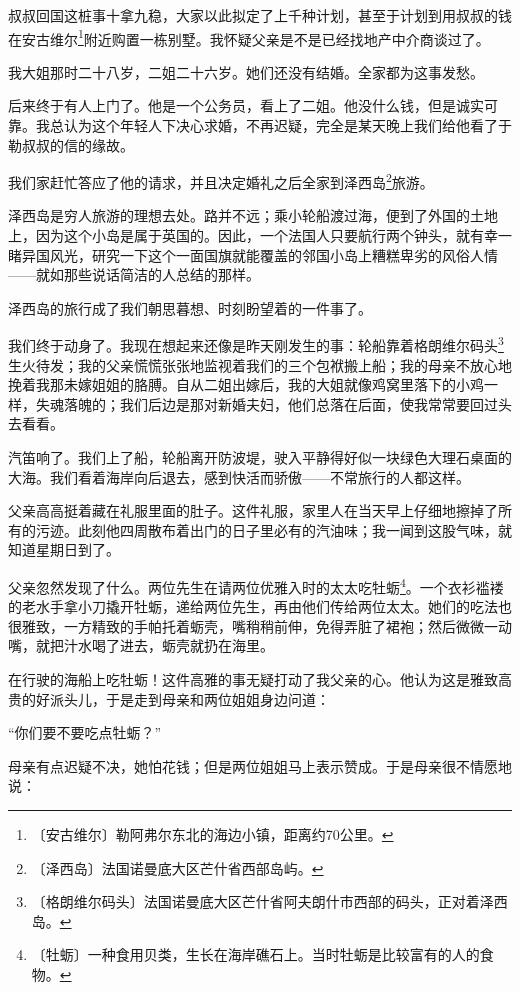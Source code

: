 \documentclass[12pt,UTF-8,openany]{ctexbook}
\begin{document}
\begin{large}
    叔叔回国这桩事十拿九稳，大家以此拟定了上千种计划，甚至于计划到用叔叔的钱在安古维尔\footnote{〔安古维尔〕勒阿弗尔东北的海边小镇，距离约70公里。}附近购置一栋别墅。我怀疑父亲是不是已经找地产中介商谈过了。
    
    我大姐那时二十八岁，二姐二十六岁。她们还没有结婚。全家都为这事发愁。
    
    后来终于有人上门了。他是一个公务员，看上了二姐。他没什么钱，但是诚实可靠。我总认为这个年轻人下决心求婚，不再迟疑，完全是某天晚上我们给他看了于勒叔叔的信的缘故。
    
    我们家赶忙答应了他的请求，并且决定婚礼之后全家到泽西岛\footnote{〔泽西岛〕法国诺曼底大区芒什省西部岛屿。}旅游。
    
    泽西岛是穷人旅游的理想去处。路并不远；乘小轮船渡过海，便到了外国的土地上，因为这个小岛是属于英国的。因此，一个法国人只要航行两个钟头，就有幸一睹异国风光，研究一下这个一面国旗就能覆盖的邻国小岛上糟糕卑劣的风俗人情——就如那些说话简洁的人总结的那样。
    
    泽西岛的旅行成了我们朝思暮想、时刻盼望着的一件事了。
    
    我们终于动身了。我现在想起来还像是昨天刚发生的事：轮船靠着格朗维尔码头\footnote{〔格朗维尔码头〕法国诺曼底大区芒什省阿夫朗什市西部的码头，正对着泽西岛。}生火待发；我的父亲慌慌张张地监视着我们的三个包袱搬上船；我的母亲不放心地挽着我那未嫁姐姐的胳膊。自从二姐出嫁后，我的大姐就像鸡窝里落下的小鸡一样，失魂落魄的；我们后边是那对新婚夫妇，他们总落在后面，使我常常要回过头去看看。
    
    汽笛响了。我们上了船，轮船离开防波堤，驶入平静得好似一块绿色大理石桌面的大海。我们看着海岸向后退去，感到快活而骄傲——不常旅行的人都这样。
    
    父亲高高挺着藏在礼服里面的肚子。这件礼服，家里人在当天早上仔细地擦掉了所有的污迹。此刻他四周散布着出门的日子里必有的汽油味；我一闻到这股气味，就知道星期日到了。
    
    父亲忽然发现了什么。两位先生在请两位优雅入时的太太吃牡蛎\footnote{〔牡蛎〕一种食用贝类，生长在海岸礁石上。当时牡蛎是比较富有的人的食物。}。一个衣衫褴褛的老水手拿小刀撬开牡蛎，递给两位先生，再由他们传给两位太太。她们的吃法也很雅致，一方精致的手帕托着蛎壳，嘴稍稍前伸，免得弄脏了裙袍；然后微微一动嘴，就把汁水喝了进去，蛎壳就扔在海里。
    
    在行驶的海船上吃牡蛎！这件高雅的事无疑打动了我父亲的心。他认为这是雅致高贵的好派头儿，于是走到母亲和两位姐姐身边问道：
    
    “你们要不要吃点牡蛎？”
    
    母亲有点迟疑不决，她怕花钱；但是两位姐姐马上表示赞成。于是母亲很不情愿地说：
    

\end{large}
\end{document}
